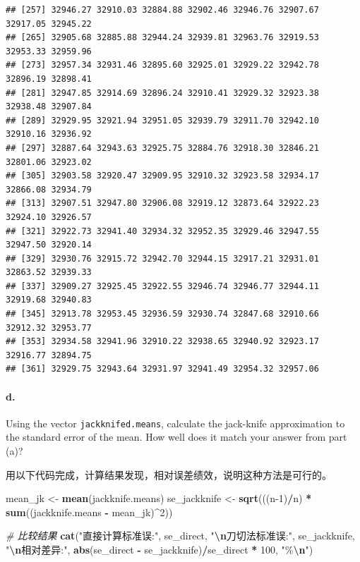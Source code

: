 \documentclass[
]{article}
\newenvironment{Shaded}{\begin{snugshade}}{\end{snugshade}}
\newcommand{\CommentTok}[1]{\textcolor[rgb]{0.56,0.35,0.01}{\textit{#1}}}
\newcommand{\DecValTok}[1]{\textcolor[rgb]{0.00,0.00,0.81}{#1}}
\newcommand{\FunctionTok}[1]{\textcolor[rgb]{0.13,0.29,0.53}{\textbf{#1}}}
\newcommand{\NormalTok}[1]{#1}
\newcommand{\OtherTok}[1]{\textcolor[rgb]{0.56,0.35,0.01}{#1}}
\newcommand{\SpecialCharTok}[1]{\textcolor[rgb]{0.81,0.36,0.00}{\textbf{#1}}}
\newcommand{\StringTok}[1]{\textcolor[rgb]{0.31,0.60,0.02}{#1}}
\begin{document}
\begin{verbatim}
## [257] 32946.27 32910.03 32884.88 32902.46 32946.76 32907.67 32917.05 32945.22
## [265] 32905.68 32885.88 32944.24 32939.81 32963.76 32919.53 32953.33 32959.96
## [273] 32957.34 32931.46 32895.60 32925.01 32929.22 32942.78 32896.19 32898.41
## [281] 32947.85 32914.69 32896.24 32910.41 32929.32 32923.38 32938.48 32907.84
## [289] 32929.95 32921.94 32951.05 32939.79 32911.70 32942.10 32910.16 32936.92
## [297] 32887.64 32943.63 32925.75 32884.76 32918.30 32846.21 32801.06 32923.02
## [305] 32903.58 32920.47 32909.95 32910.32 32923.58 32934.17 32866.08 32934.79
## [313] 32907.51 32947.80 32906.08 32919.12 32873.64 32922.23 32924.10 32926.57
## [321] 32922.73 32941.40 32934.32 32952.35 32929.46 32947.55 32947.50 32920.14
## [329] 32930.76 32915.72 32942.70 32944.15 32917.21 32931.01 32863.52 32939.33
## [337] 32909.27 32925.45 32922.55 32946.74 32946.77 32944.11 32919.68 32940.83
## [345] 32913.78 32953.45 32936.59 32930.74 32847.68 32910.66 32912.32 32953.77
## [353] 32934.58 32941.96 32910.22 32938.65 32940.92 32923.17 32916.77 32894.75
## [361] 32929.75 32943.64 32931.97 32941.49 32954.32 32957.06
\end{verbatim}

\paragraph{d.~}\label{d.}

Using the vector \texttt{jackknifed.means}, calculate the jack-knife
approximation to the standard error of the mean. How well does it match
your answer from part (a)?

用以下代码完成，计算结果发现，相对误差绩效，说明这种方法是可行的。

\begin{Shaded}
\begin{Highlighting}[]
\NormalTok{mean\_jk }\OtherTok{\textless{}{-}} \FunctionTok{mean}\NormalTok{(jackknife.means)}
\NormalTok{se\_jackknife }\OtherTok{\textless{}{-}} \FunctionTok{sqrt}\NormalTok{(((n}\DecValTok{{-}1}\NormalTok{)}\SpecialCharTok{/}\NormalTok{n) }\SpecialCharTok{*} \FunctionTok{sum}\NormalTok{((jackknife.means }\SpecialCharTok{{-}}\NormalTok{ mean\_jk)}\SpecialCharTok{\^{}}\DecValTok{2}\NormalTok{))}

\CommentTok{\# 比较结果}
\FunctionTok{cat}\NormalTok{(}\StringTok{"直接计算标准误:"}\NormalTok{, se\_direct, }\StringTok{"}\SpecialCharTok{\textbackslash{}n}\StringTok{刀切法标准误:"}\NormalTok{, se\_jackknife, }\StringTok{"}\SpecialCharTok{\textbackslash{}n}\StringTok{相对差异:"}\NormalTok{, }
    \FunctionTok{abs}\NormalTok{(se\_direct }\SpecialCharTok{{-}}\NormalTok{ se\_jackknife)}\SpecialCharTok{/}\NormalTok{se\_direct }\SpecialCharTok{*} \DecValTok{100}\NormalTok{, }\StringTok{"\%}\SpecialCharTok{\textbackslash{}n}\StringTok{"}\NormalTok{)}
\end{Highlighting}
\end{Shaded}
\end{document}
